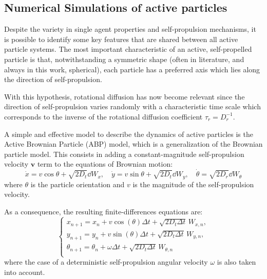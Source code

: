 \documentclass[../../master_thesis_np.tex]{subfiles}
\begin{document}
	\subsection[ABP simulations]{Numerical Simulations of active particles}%
	
		Despite the variety in single agent properties and self-propulsion mechanisms, it is possible to identify some key features that are shared between all active particle systems. 
		The most important characteristic of an active, self-propelled particle is that, notwithstanding a symmetric shape (often in literature, and always in this work, spherical), each particle has a preferred axis which lies along the direction of self-propulsion.
		
		With this hypothesis, rotational diffusion has now become relevant since the direction of self-propulsion varies randomly with a characteristic time scale which corresponds to the inverse of the rotational diffusion coefficient $\tau_r = D_r^{-1}$. 
		
		A simple and effective model to describe the dynamics of active particles is the Active Brownian Particle (ABP) model, which is a generalization of the Brownian particle model.
		This consists in adding a constant-magnitude self-propulsion velocity $\mathbf{v}$ term to the equations of Brownian motion:
		\begin{equation}
			\dot{x} = v \cos{\theta} + \sqrt{2D_t}\dd{W_x} , \quad \dot{y} = v \sin{\theta} + \sqrt{2D_t}\dd{W_y}, \quad \dot{\theta} = \sqrt{2D_r}\dd{W_{\theta}}
		\end{equation}
		where $\theta$ is the particle orientation and $v$ is the magnitude of the self-propulsion velocity.
		
		As a consequence, the resulting finite-differences equations are:
		\begin{equation} \label{eq:fin_diff1}
			\begin{cases}
				x_{n+1} = x_n + v \cos(\theta) \Delta t + \sqrt{2D_t \Delta t} \, W_{x,n},\\
				y_{n+1} = y_n + v \sin(\theta) \Delta t + \sqrt{2D_t \Delta t} \, W_{y,n},\\
				\theta_{n+1} = \theta_n + \omega \Delta t + \sqrt{2D_t \Delta t} \, W_{\theta,n}\\
			\end{cases}
		\end{equation}
		where the case of a deterministic self-propulsion angular velocity $\omega$ is also taken into account.
		
\end{document}
